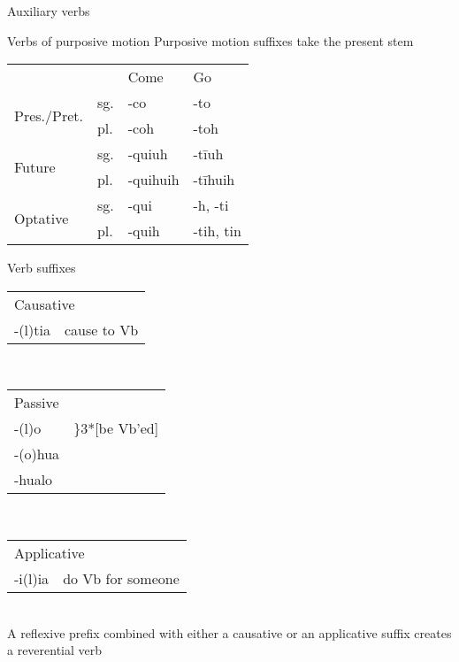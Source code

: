 \documentclass[12pt]{beamer}
\newcommand{\nah}[1]{\textcolor{nahgrn}{#1}}
\newcommand{\trs}[1]{\textcolor{nahblu}{#1}}
\begin{document}
\begin{frame}
\begin{columns}[t]
\begin{column}{.18\linewidth}
\begin{block}{Auxiliary verbs}
      \end{block}
      \begin{block}{Verbs of purposive motion}
        Purposive motion suffixes take the present stem
        \begin{tabular}{llll}
                                       &     & \trs{Come}     & \trs{Go}          \\
          \multirow{2}{*}{Pres./Pret.} & sg. & \nah{-co}      & \nah{-to}         \\
                                       & pl. & \nah{-coh}     & \nah{-toh}        \\
          \multirow{2}{*}{Future}      & sg. & \nah{-quiuh}   & \nah{-tīuh}       \\
                                       & pl. & \nah{-quihuih} & \nah{-tīhuih}     \\
          \multirow{2}{*}{Optative}    & sg. & \nah{-qui}     & \nah{-h,   -ti}   \\
                                       & pl. & \nah{-quih}    & \nah{-tih,   tin} \\
        \end{tabular}
      \end{block}
      \begin{block}{Verb suffixes}
        \begin{tabular}[t]{ll}
          \multicolumn{2}{l}{Causative}     \\
          \nah{-(l)tia} & \trs{cause to Vb}
        \end{tabular}
        \\[1ex]
        \begin{tabular}[t]{ll}
          \multicolumn{2}{l}{Passive}                                  \\
          \nah{-(l)o}   & \trs{\hspace{-1em}\rdelim\}{3}{*}[be Vb'ed]} \\
          \nah{-(o)hua} &                                              \\
          \nah{-hualo}  &                                              \\
        \end{tabular}
        \\[1ex]
        \begin{tabular}[t]{ll}
          \multicolumn{2}{l}{Applicative}         \\
          \nah{-i(l)ia} & \trs{do Vb for someone}
        \end{tabular}
        \\[1ex]
        A reflexive prefix combined with either a causative or an applicative suffix creates a reverential verb
      \end{block}


\end{column}
\end{columns}
\end{frame}
\end{document}
